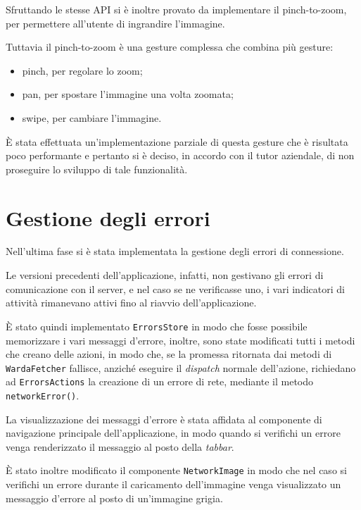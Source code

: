 Sfruttando le stesse API si è inoltre provato da implementare il pinch-to-zoom, per permettere all'utente di ingrandire l'immagine.

Tuttavia il pinch-to-zoom è una gesture complessa che combina più gesture:
\begin{itemize}
\item pinch, per regolare lo zoom;
\item pan, per spostare l'immagine una volta zoomata;
\item swipe, per cambiare l'immagine.
\end{itemize}

\`E stata effettuata un'implementazione parziale di questa gesture che è risultata poco performante e pertanto si è deciso, in accordo con il tutor aziendale, di non proseguire lo sviluppo di tale funzionalità.

\section{Gestione degli errori}

Nell'ultima fase si è stata implementata la gestione degli errori di connessione.

Le versioni precedenti dell'applicazione, infatti, non gestivano gli errori di comunicazione con il server, e nel caso se ne verificasse uno, i vari indicatori di attività rimanevano attivi fino al riavvio dell'applicazione.

\`E stato quindi implementato \texttt{ErrorsStore} in modo che fosse possibile memorizzare i vari messaggi d'errore, inoltre, sono state modificati tutti i metodi che creano delle azioni, in modo che, se la promessa ritornata dai metodi di \texttt{WardaFetcher} fallisce, anziché eseguire il \textit{dispatch} normale dell'azione, richiedano ad \texttt{ErrorsActions} la creazione di un errore di rete, mediante il metodo \texttt{networkError()}.

La visualizzazione dei messaggi d'errore è stata affidata al componente di navigazione principale dell'applicazione, in modo quando si verifichi un errore venga renderizzato il messaggio al posto della \textit{tabbar}.

\`E stato inoltre modificato il componente \texttt{NetworkImage} in modo che nel caso si verifichi un errore durante il caricamento dell'immagine venga visualizzato un messaggio d'errore al posto di un'immagine grigia.